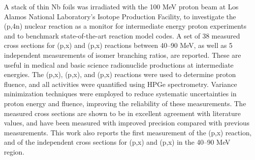 
A stack  of thin Nb 
foils was irradiated with the 100 MeV proton beam at  Los Alamos National Laboratory's Isotope Production Facility,  to investigate the (p,4n) nuclear reaction as a  monitor for intermediate energy proton experiments and to benchmark state-of-the-art reaction model codes.
A set of 38 measured  cross sections for  (p,x) and  (p,x) reactions between 40--90 MeV, as well as 5 independent measurements of isomer branching ratios, are reported. 
These are useful in medical and basic science radionuclide productions at intermediate energies. 
The
(p,x), (p,x), and (p,x)  reactions were used to
determine proton fluence, and all activities were quantified using HPGe spectrometry.
Variance minimization techniques were employed to reduce systematic uncertainties in proton energy and fluence, improving the reliability of these measurements. 
The measured cross sections are shown to be in excellent agreement with  literature values, and have been measured with improved precision compared with previous measurements.
This work also reports the first measurement of the  (p,x) reaction, and of the independent cross sections for    
(p,x) and (p,x) in the 40--90 MeV region.

